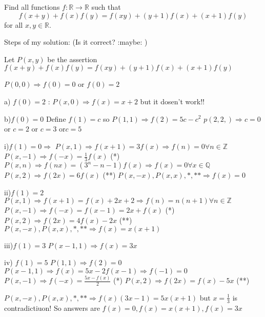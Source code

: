 \begin{solution}
	\begin{tcolorbox}Find all functions $f : \mathbb{R} \rightarrow \mathbb{R}$ such that
\[f(x+y) + f(x)f(y) = f(xy) + (y+1)f(x) + (x+1)f(y)\]
for all $x,y \in \mathbb{R}$.\end{tcolorbox}

Steps of my solution: (Is it correct?  :maybe: )

Let $P(x,y)$ be the assertion  $f(x+y) + f(x)f(y) = f(xy) + (y+1)f(x) + (x+1)f(y)$ 

$P(0,0) \Rightarrow f(0)=0 $ or $f(0)=2$
 
a) $f(0)=2$ : $P(x,0) \Rightarrow f(x)=x+2$  but it dosen't work!!

b)$f(0)=0$  Define $f(1)=c$ so $P(1,1) \Rightarrow f(2)=5c-c^2$
$p(2,2,) \Rightarrow c=0$ or $c=2$ or $c=3$ or$c=5$

i)$f(1)=0 \Rightarrow $ 
$P(x,1) \Rightarrow f(x+1)=3f(x) \Rightarrow f(n)=0 \forall n \in \mathbb{Z}$
$P(x,-1) \Rightarrow f(-x)= \frac 13 f(x)$ (*)
$P(x,n) \Rightarrow f(nx)= (3^n-n-1)f(x) \Rightarrow f(x)=0 \forall x \in \mathbb{Q}$ 
$P(x,2) \Rightarrow f(2x)=6f(x)$ (**)
$P(x,-x) , P(x,x) ,* ,**\Rightarrow f(x)=0 $

ii)$f(1)=2$ 
 $P(x,1) \Rightarrow f(x+1)=f(x)+2x+2 \Rightarrow f(n)=n(n+1) \forall n \in \mathbb{Z}$
$P(x,-1) \Rightarrow f(-x)= f(x-1) =2x+f(x)$ (*)
$P(x,2) \Rightarrow f(2x)=4f(x)-2x$ (**)
$P(x,-x) , P(x,x) ,* ,**\Rightarrow f(x)=x(x+1) $

iii)$f(1)=3$
$P(x-1,1) \Rightarrow f(x)=3x$

iv) $f(1)=5$
$P(1,1) \Rightarrow f(2)=0$ 
$P(x-1,1) \Rightarrow f(x)=5x-2f(x-1) \Rightarrow f(-1)=0$
$P(x,-1) \Rightarrow f(-x)=\frac{5x-f(x)}{2}$ (*)
$P(x,2) \Rightarrow f(2x)=f(x)-5x$ (**)

$P(x,-x) , P(x,x) ,* , ** \Rightarrow f(x)(3x-1) = 5x(x+1) $ but $x=\frac 13 $ is contradictiuon!
So answers are $f(x)=0, f(x)=x(x+1), f(x)=3x$

\end{solution}



